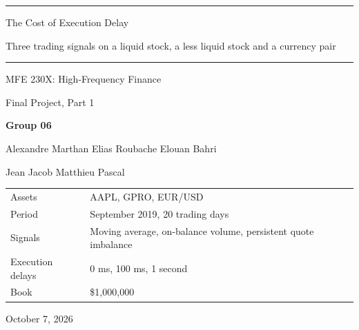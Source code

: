 \documentclass[11pt]{article}
\begin{document}
\begin{titlepage}
  \hypersetup{pageanchor=false}
  \centering
  \vspace*{1.6cm}
  {\color{accent}\rule{\textwidth}{1.5pt}}\par
  \vspace{1.0cm}
  {\color{accent}\par}
  \vspace{0.9cm}
  {\LARGE The Cost of Execution Delay\par}
  \vspace{0.35cm}
  {\large Three trading signals on a liquid stock, a less liquid stock and a currency pair\par}
  \vspace{1.0cm}
  {\color{accent}\rule{\textwidth}{1.5pt}}\par
  \vspace{1.5cm}
  {\Large MFE 230X: High-Frequency Finance\par}
  \vspace{0.25cm}
  {\large Final Project, Part 1\par}
  \vspace{1.5cm}
  {\Large\bfseries Group 06\par}
  \vspace{0.45cm}
  {\large Alexandre Marthan \quad Elias Roubache \quad Elouan Bahri\par}
  \vspace{0.15cm}
  {\large Jean Jacob \quad Matthieu Pascal\par}
  \vfill
  {\small
  \begin{tabular}{@{}ll@{}}
    \toprule
    Assets            & AAPL, GPRO, EUR/USD \\
    Period            & September 2019, 20 trading days \\
    Signals           & Moving average, on-balance volume, persistent quote imbalance \\
    Execution delays  & 0 ms, 100 ms, 1 second \\
    Book              & \$1{,}000{,}000 \\
    \bottomrule
  \end{tabular}\par}
  \vfill
  {\large October 7, 2026\par}
\end{titlepage}
\hypersetup{pageanchor=true}

\tableofcontents
\end{document}
